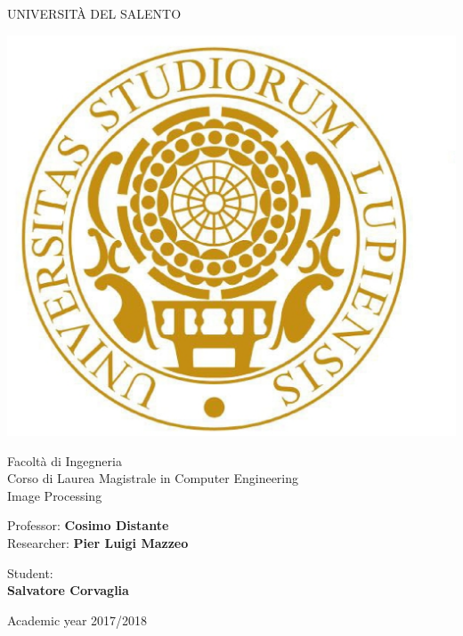 \thispagestyle{empty}                                                 
\begin{center}                                                            
    \vspace{5mm}                                                           
 {\LARGE UNIVERSIT\`A DEL SALENTO} \\                       
      \vspace{5mm}
\end{center}
\begin{center}
{\includegraphics[scale=.20]{figs/logo_unisalento}}      
\end{center}
\begin{center}
      \vspace{5mm}
      {\LARGE Facolt\`a di Ingegneria} \\
        \vspace{3mm}
      {\Large Corso di Laurea Magistrale in Computer Engineering} \\
      \vspace{20mm}
      {\LARGE Image Processing} \\
      \vspace{15mm}
\end{center}
\begin{flushleft}                                                                              
     {\large Professor: \textbf{\@ Cosimo Distante}} \\
     {\large Researcher: \textbf{\@ Pier Luigi Mazzeo}} \\        
      \vspace{13mm}
\end{flushleft}
\begin{flushright}
      {\large Student:}\\
      {\textbf{Salvatore Corvaglia}}\\
\end{flushright}        %
\begin{center}
\vfill
      {\large Academic year \@2017/2018} \\
\end{center}
